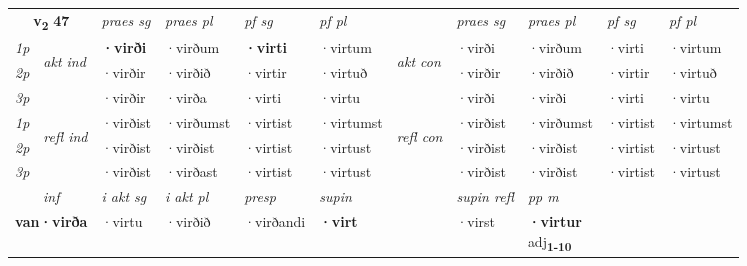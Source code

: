 \noindent
\begin{tabular}{lllllllllll} \toprule
\multicolumn{2}{c}{\textbf{v{\textsubscript{2}}} \Large{\textbf{47}}}  &  \textit{praes sg}  & \textit{praes pl}  &\textit{ pf sg} & \textit{pf pl} &  &  \textit{praes sg}  & \textit{praes pl}  & \textit{pf sg} & \textit{pf pl } \\*
	\cmidrule{3-6} \cmidrule{8-11}
 {\textit{1p}} & \multirow{3}{*}{\begin{turn}{90}\textit{akt ind}\end{turn}} & \textbf{·virði} & ·virðum & \textbf{·virti} & ·virtum & \multirow{3}{*}{\begin{turn}{90}\textit{akt con}\end{turn}} &·virði & ·virðum & ·virti & ·virtum\\*
 {\textit{2p}} &  &  ·virðir  & ·virðið & ·virtir & ·virtuð & & ·virðir & ·virðið & ·virtir & ·virtuð \\*
{\textit{3p}} &  & ·virðir & ·virða & ·virti & ·virtu & & ·virði & ·virði& ·virti & ·virtu \\*
\cmidrule{3-6} \cmidrule{8-11}
 {\textit{1p}} & \multirow{3}{*}{\begin{turn}{90}\textit{refl ind}\end{turn}}  & ·virðist & ·virðumst & ·virtist & ·virtumst & \multirow{3}{*}{\begin{turn}{90}\textit{refl con}\end{turn}}  &·virðist & ·virðumst & ·virtist & ·virtumst \\*
 {\textit{2p}} &  & ·virðist & ·virðist & ·virtist & ·virtust & &·virðist & ·virðist & ·virtist & ·virtust \\*
 {\textit{3p}}  & & ·virðist & ·virðast & ·virtist & ·virtust & & ·virðist & ·virðist& ·virtist & ·virtust \\*
\cmidrule{3-6} \cmidrule{8-11}

   \multicolumn{2}{c}{\textit{inf}}  & \textit{i akt sg} & \textit{i akt pl}   & \textit{presp} & \textit{supin} && \textit{supin refl} & \textit{pp m} \\*
  \multicolumn{2}{c}{\textbf{van\allowbreak ·virða}} & ·virtu  & ·virðið   & ·virðandi &  \textbf{·virt} && ·virst & \specialcell{\textbf{·virtur} \\ adj\textbf{\textsubscript{1-10}}} \\*
\end{tabular}

